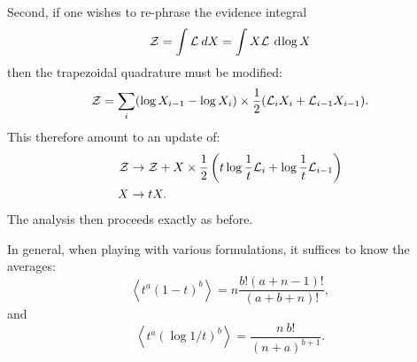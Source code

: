 Second, if one wishes to re-phrase the evidence integral
\begin{equation}
  \mathcal{Z} = \int \mathcal{L} \: dX = \int X\mathcal{L} \: \operatorname{d}^{}\!{\log X}
\end{equation}
then the trapezoidal quadrature must be modified:
\begin{equation}
  \mathcal{Z} = \sum\limits_{i} (\log X_{i-1}-\log X_{i}) \times \frac{1}{2}(\mathcal{L}_iX_i+\mathcal{L}_{i-1}X_{i-1}).
\end{equation}
This therefore amount to an update of:
\begin{align}
  \mathcal{Z} &\to \mathcal{Z} + X \times \frac{1}{2}\left(t\log\frac{1}{t}\mathcal{L}_i + \log\frac{1}{t}\mathcal{L}_{i-1} \right)
  \\
  X &\to t X.
\end{align}
The analysis then proceeds exactly as before. 

In general, when playing with various formulations, it suffices to know the averages:
\begin{equation}
\left\langle t^a{(1-t)}^b \right\rangle = n\frac{b!(a+n-1)!}{(a+b+n)!},
\end{equation}
and
\begin{equation}
  \left\langle t^a{\left( \log1/t \right)}^b \right\rangle 
  = 
  \frac{n\: b!}{{(n+a)}^{b+1}}.
\end{equation}
